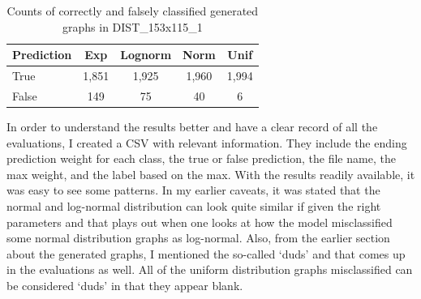 \documentclass[12pt]{article}
\begin{document}
            \begin{table}

                \begin{center}

                    \begin{tabular}{| l | c | c | c | c |}

                        \hline
                        \textbf{Prediction}   &    \textbf{Exp}   &   \textbf{Lognorm}   &    \textbf{Norm}    &    \textbf{Unif} \\
                        \hline
                        True                  & 1,851             & 1,925                & 1,960               & 1,994 \\
                        False                 & 149               & 75                   & 40                  & 6 \\

                        \hline

                    \end{tabular}

                    \caption{Counts of correctly and falsely classified generated graphs in DIST\_153x115\_1}
                    \label{counts-all-gen-dist}

                \end{center}

            \end{table}
            
            In order to understand the results better and have a clear record of all the evaluations, 
            I created a CSV with relevant information. They include the ending prediction weight for each class, 
            the true or false prediction, the file name, the max weight, and the label based on the max.
            With the results readily available, it was easy to see some patterns. 
            In my earlier caveats, it was stated that the normal and log-normal distribution can look quite similar 
            if given the right parameters and that plays out when one looks at 
            how the model misclassified some normal distribution graphs as log-normal. 
            Also, from the earlier section about the generated graphs, 
            I mentioned the so-called ‘duds’ and that comes up in the evaluations as well. 
            All of the uniform distribution graphs misclassified can be considered ‘duds’ in that they appear blank.
            
\end{document}
